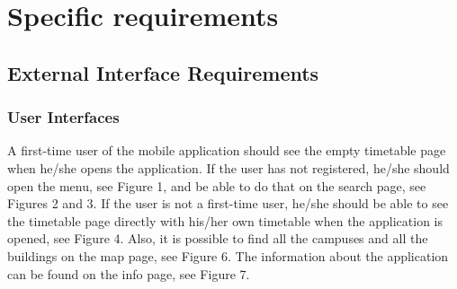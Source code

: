 \documentclass{scrreprt}
\begin{document}
\chapter{Specific requirements}
\section{External Interface Requirements}

\subsection{User Interfaces}
A first-time user of the mobile application should see the empty timetable page when he/she opens the application. If the user has not registered, he/she should open the menu, see Figure 1, and be able to do that on the search page, see Figures 2 and 3.
If the user is not a first-time user, he/she should be able to see the timetable page directly with his/her own timetable when the
application is opened, see Figure 4.   Also, it is possible to find all the campuses and all the buildings on the map page, see Figure 6. The information about the application can be found on the info page, see Figure 7.
\end{document}

